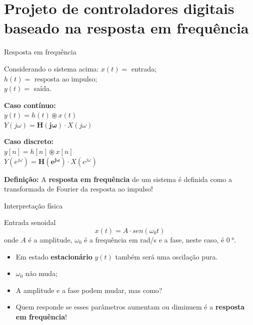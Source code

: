 \section{Projeto de controladores digitais baseado na resposta em frequência}

\begin{frame}{Resposta em frequência}
\begin{center}
  \scalebox{1}{}  
\end{center}
\begin{block}{Considerando o sistema acima:}
$ x(t) = $ entrada;\\
$ h(t) = $ resposta ao impulso;\\
$ y(t) = $ saída.\\
\vspace{0.3 cm}
\begin{minipage}[t]{0.48\linewidth}
    \centering
        \textbf{Caso contínuo:}\\
	    $y(t) = h(t) \circledast x(t)$ \\
	    $Y(j\omega) = \bm{H(j\omega)}\cdot X(j\omega)$
\end{minipage}\hfill
\begin{minipage}[t]{0.48\linewidth}
    \centering
        \textbf{Caso discreto:}\\
	    $y[n] = h[n] \circledast x[n]$ \\
	    $Y(e^{j\omega}) = \bm{H(e^{j\omega})}\cdot X(e^{j\omega})$
\end{minipage}

\vspace{0.3 cm}
\textbf{Definição:} A \textbf{resposta em frequência} de um sistema é definida como a transformada de Fourier da resposta ao impulso!
\end{block}
\end{frame}

\begin{frame}{Interpretação física}
\begin{block}{Entrada senoidal}
	\begin{equation*}
	    x(t) = A \cdot sen(\omega_{0}t)
	\end{equation*}
onde $A$ é a  amplitude, $ \omega_{0} $ é a frequência em rad/s e a fase, neste caso, é $\SI{0}{\degree}$.
\vspace{0.3 cm}
\begin{itemize}
    \item Em estado \textbf{estacionário} $y(t)$ também será uma oscilação pura.
    \item $ \omega_{0} $ não muda;
    \item A amplitude e a fase podem mudar, mas como?
    \item Quem responde se esses parâmetros aumentam ou diminuem é a \textbf{resposta em frequência}!
\end{itemize}
\end{block}
\end{frame}

